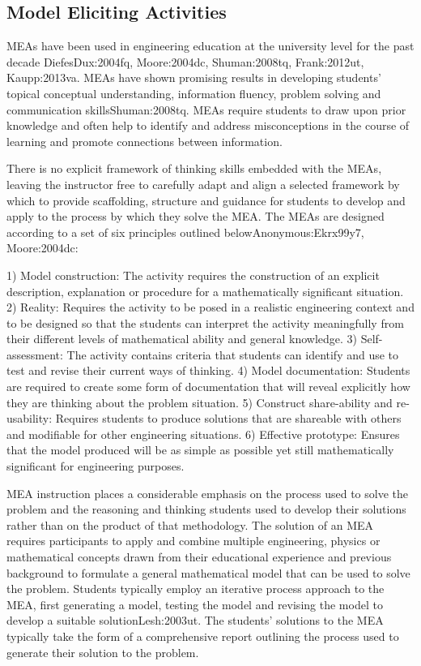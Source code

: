 \subsection{Model Eliciting Activities}

MEAs have been used in engineering education at the university level for the past decade {DiefesDux:2004fq, Moore:2004dc, Shuman:2008tq, Frank:2012ut, Kaupp:2013va}. MEAs have shown promising results in developing students’ topical conceptual understanding, information fluency, problem solving and communication skills{Shuman:2008tq}. MEAs require students to draw upon prior knowledge and often help to identify and address misconceptions in the course of learning and promote connections between information.

There is no explicit framework of thinking skills embedded with the MEAs, leaving the instructor free to carefully adapt and align a selected framework by which to provide scaffolding, structure and guidance for students to develop and apply to the process by which they solve the MEA. The MEAs are designed according to a set of six principles outlined below{Anonymous:Ekrx99y7, Moore:2004dc}: 

1)	Model construction: The activity requires the construction of an explicit description, explanation or procedure for a mathematically significant situation.
2)	Reality: Requires the activity to be posed in a realistic engineering context and to be designed so that the students can interpret the activity meaningfully from their different levels of mathematical ability and general knowledge.
3)	Self-assessment: The activity contains criteria that students can identify and use to test and revise their current ways of thinking.
4)	Model documentation: Students are required to create some form of documentation that will reveal explicitly how they are thinking about the problem situation.
5)	Construct share-ability and re-usability: Requires students to produce solutions that are shareable with others and modifiable for other engineering situations.
6)	Effective prototype: Ensures that the model produced will be as simple as possible yet still mathematically significant for engineering purposes.
 
MEA instruction places a considerable emphasis on the process used to solve the problem and the reasoning and thinking students used to develop their solutions rather than on the product of that methodology. The solution of an MEA requires participants to apply and combine multiple engineering, physics or mathematical concepts drawn from their educational experience and previous background to formulate a general mathematical model that can be used to solve the problem. Students typically employ an iterative process approach to the MEA, first generating a model, testing the model and revising the model to develop a suitable solution{Lesh:2003ut}. The students’ solutions to the MEA typically take the form of a comprehensive report outlining the process used to generate their solution to the problem. 

